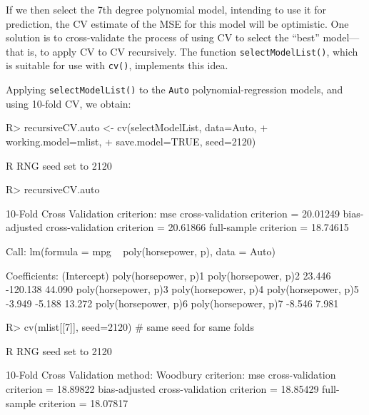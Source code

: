 \documentclass[
]{jss}
\begin{document}
If we then select the 7th degree polynomial model, intending to use it
for prediction, the CV estimate of the MSE for this model will be
optimistic. One solution is to cross-validate the process of using CV to
select the ``best'' model---that is, to apply CV to CV recursively. The
function \texttt{selectModelList()}, which is suitable for use with
\texttt{cv()}, implements this idea.

Applying \texttt{selectModelList()} to the \texttt{Auto}
polynomial-regression models, and using 10-fold CV, we obtain:

\begin{CodeChunk}
\begin{CodeInput}
R> recursiveCV.auto <- cv(selectModelList, data=Auto, 
+                        working.model=mlist,
+                        save.model=TRUE, seed=2120)
\end{CodeInput}
\begin{CodeOutput}
R RNG seed set to 2120
\end{CodeOutput}
\begin{CodeInput}
R> recursiveCV.auto
\end{CodeInput}
\begin{CodeOutput}
10-Fold Cross Validation
criterion: mse
cross-validation criterion = 20.01249
bias-adjusted cross-validation criterion = 20.61866
full-sample criterion = 18.74615 
\end{CodeOutput}
\begin{CodeOutput}

Call:
lm(formula = mpg ~ poly(horsepower, p), data = Auto)

Coefficients:
         (Intercept)  poly(horsepower, p)1  poly(horsepower, p)2  
              23.446              -120.138                44.090  
poly(horsepower, p)3  poly(horsepower, p)4  poly(horsepower, p)5  
              -3.949                -5.188                13.272  
poly(horsepower, p)6  poly(horsepower, p)7  
              -8.546                 7.981  
\end{CodeOutput}
\begin{CodeInput}
R> cv(mlist[[7]], seed=2120) # same seed for same folds
\end{CodeInput}
\begin{CodeOutput}
R RNG seed set to 2120
\end{CodeOutput}
\begin{CodeOutput}
10-Fold Cross Validation
method: Woodbury
criterion: mse
cross-validation criterion = 18.89822
bias-adjusted cross-validation criterion = 18.85429
full-sample criterion = 18.07817 
\end{CodeOutput}
\end{CodeChunk}
\end{document}
